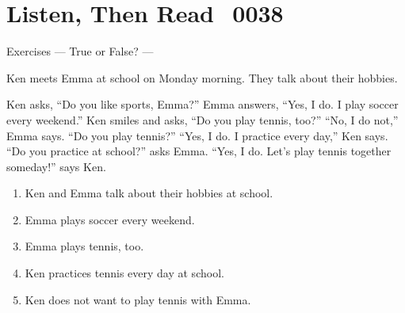 \documentclass[aspectratio=169,xcolor={dvipsnames,table}]{beamer}
\newcommand{\myaudio}[1]{\href{#1}{\faVolumeUp}}
\begin{document}
\section{Listen, Then Read\,\,\,\,\,{\tiny 0038}\,{\scriptsize \myaudio{./audio/010_question_do_reading.mp3}}}
\begin{frame}[plain,t]{Exercises --- True or False? ---}
\begin{tcolorbox}[colframe=ForestGreen,
  colback=NavyBlue!10!white,
  colbacktitle=NavyBlue!40!white,
  coltitle=black, %
before upper={\setlength{\parindent}{1.25em}},
 title={New Friends at School\hfill{\tiny 0038}\quad{\scriptsize \myaudio{./audio/010_question_do_reading.mp3}}}
]
\noindent{}Ken meets Emma at school on Monday morning.
They talk about their hobbies.

Ken asks, ``Do you like sports, Emma?''
Emma answers, ``Yes, I do.
I play soccer every weekend.''
Ken smiles and asks, ``Do you play tennis, too?''
``No, I do not,'' Emma says.
``Do you play tennis?''
``Yes, I do.
I practice every day,'' Ken says.
``Do you practice at school?'' asks Emma.
``Yes, I do.
Let's play tennis together someday!'' says Ken.
\end{tcolorbox}

\vspace{-4pt}
\begin{enumerate}\setlength{\itemsep}{-3.2pt}
\item<2-> Ken and Emma talk about their hobbies at school.\hfill\visible<3->{T}
\item<2-> Emma plays soccer every weekend.\hfill{}
\item<2-> Emma plays tennis, too.\hfill{}
\item<2-> Ken practices tennis every day at school.\hfill{}
\item<2-> Ken does not want to play tennis with Emma.\hfill{}
\end{enumerate}
\end{frame}
\end{document}
